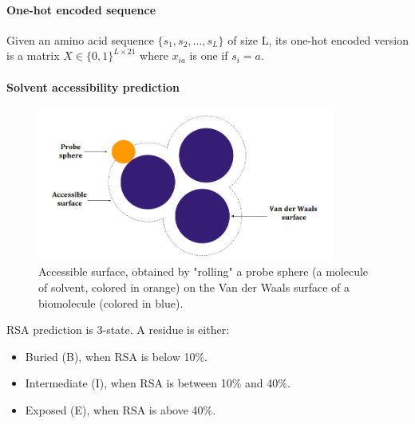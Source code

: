         \paragraph{One-hot encoded sequence}

            Given an amino acid sequence $\{s_1, s_2, \ldots,
            s_L\}$ of size L, its one-hot encoded version
            is a matrix $X \in \{0, 1\}^{L \times 21}$
            where $x_{ia}$ is one if $s_i = a$.

        \paragraph{Solvent accessibility prediction}

            \todo{}

            \begin{figure}[H]
                \begin{center}
                    \includegraphics[height=5cm, keepaspectratio]{imgs/accessibility.png}
                    \caption{Accessible surface, obtained by "rolling" a probe sphere (a molecule
                        of solvent, colored in orange) on the Van der Waals surface of a biomolecule
                        (colored in blue).}
                    \label{architecture}
                \end{center}
            \end{figure}

            RSA prediction is 3-state. A residue is either:
            \begin{itemize}
                \item Buried (B), when RSA is below 10\%.
                \item Intermediate (I), when RSA is between 10\% and 40\%.
                \item Exposed (E), when RSA is above 40\%.
            \end{itemize}


